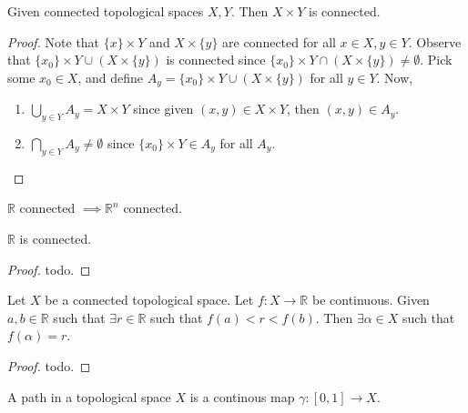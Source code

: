 \begin{theorem}
   Given connected topological spaces \( X, Y \).
   Then \( X \times Y \) is connected.
\end{theorem}

\begin{proof}
  Note that \( \{ x \} \times Y \) and \( X \times \{ y \}  \)
  are connected for all \( x \in X, y \in Y \).
  Observe that \( \{ x_0 \} \times Y  \cup ( X \times \{ y \} ) \)
  is connected since \( \{ x_0 \} \times Y  \cap ( X \times \{ y \} ) \neq \emptyset \).
  Pick some \( x_0 \in X \), and define \( A_y = \{ x_0 \} \times Y  \cup ( X \times \{ y \} ) \) for all \( y \in Y \). Now,
  \begin{enumerate}
    \item \( \bigcup_{y \in Y} A_y = X \times Y \) since
      given \( (x, y) \in X \times Y \), then \( (x, y) \in A_y \).
    \item \( \bigcap_{y \in Y} A_y \neq \emptyset \) since
    \( \{ x_0 \} \times Y \in A_y \) for all \( A_y \).
  \end{enumerate}
\end{proof}

\begin{example}
   \( \mathbb{R} \) connected \( \implies \mathbb{R}^n \) connected. 
\end{example}

\begin{theorem}
    \( \mathbb{R}  \) is connected.
\end{theorem}

\begin{proof}
    todo.
\end{proof}

\begin{theorem}
  Let \( X \) be a connected topological space.
  Let \( f: X \to \mathbb{R} \) be continuous.
  Given \( a, b \in \mathbb{R} \) such that \( \exists r\in \mathbb{R} \)
  such that \( f(a) < r < f(b) \).
  Then \( \exists \alpha \in X \) such that \( f(\alpha) = r \).
\end{theorem}

\begin{proof}
   todo. 
\end{proof}

\begin{definition}[path]
   A path in a topological space \( X \)
   is a continous map \( \gamma: [0, 1] \to X \).
\end{definition}

